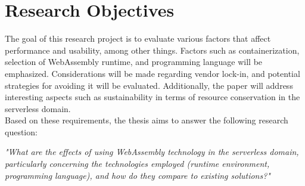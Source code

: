 \section{Research Objectives}
\label{sec:research-objectives}

The goal of this research project is to evaluate various factors that affect performance and usability, among other things. Factors such as containerization, selection of WebAssembly runtime, and programming language will be emphasized. Considerations will be made regarding vendor lock-in, and potential strategies for avoiding it will be evaluated. Additionally, the paper will address interesting aspects such as sustainability in terms of resource conservation in the \gls{serverless} domain. \\
\newline
Based on these requirements, the thesis aims to answer the following research question:
\begin{center}
\textit{"What are the effects of using WebAssembly technology in the serverless domain, particularly concerning the technologies employed (runtime environment, programming language), and how do they compare to existing solutions?"}
\end{center}

